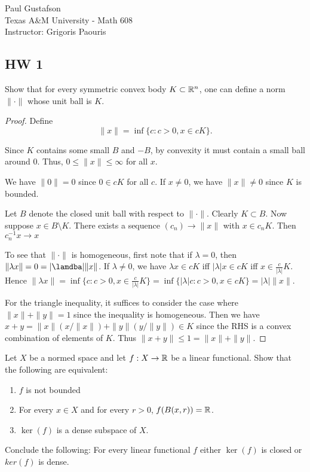 \documentclass{article}
\begin{document}
\noindent Paul Gustafson\\
\noindent Texas A\&M University - Math 608 \\ 
\noindent Instructor: Grigoris Paouris

\subsection*{HW 1}
 Show that for every symmetric convex body $K \subset \mathbb{R}^n$, one can define a norm $\| \cdot \|$ whose unit ball is $K$.
\begin{proof}
Define $$\|x\| = \inf \{ c: c > 0, x \in cK \}.$$

Since $K$ contains some small $B$ and $-B$, by convexity it must contain a small ball around $0$.  Thus, $0 \le \|x\| \le \infty$ for all $x$.

We have $\|0\| =  0$ since $0 \in cK$ for all $c$.  If $x \neq 0$, we have $\|x\| \neq 0$ since $K$ is bounded.

Let $B$ denote the closed unit ball with respect to $\| \cdot \|$. Clearly $K \subset B$. Now suppose $x \in B \setminus K$.  There exists a sequence $(c_n) \to \|x\|$ with $x \in c_nK$. Then $c_n^{-1} x \to x$

To see that $\| \cdot \|$ is homogeneous, first note that if $\lambda = 0$, then $\|\lambda x\| = 0 = |\lamdba| \|x\|$.  If $\lambda \neq 0$, we have $\lambda x \in cK$ iff $|\lambda|x \in cK$ iff $x \in \frac {c}{|\lambda|} K$. Hence $\|\lambda x\| = \inf \{ c: c > 0, x \in \frac{c}{|\lambda|}K \} = 
\inf \{ |\lambda| c: c > 0, x \in cK \} = |\lambda| \|x\|$.

For the triangle inequality, it suffices to consider the case where $\|x\| + \|y\| = 1$ since the inequality is homogeneous. Then we have
$x + y = \|x\| (x / \|x\|)  + \|y \| (y / \|y\|) \in K$ since the RHS is a convex combination of elements of $K$.  Thus $\|x + y\| \le 1 = \|x\| + \|y\|$.
\end{proof}

 Let $X$ be a normed space and let $f: X \to \mathbb{R}$ be a linear functional. Show that the following are equivalent:
\begin{enumerate}
\item $f$ is not bounded
\item For every $x \in X$ and for every $r > 0$, $f(B(x,r)) = \mathbb{R}$.
\item $\ker(f)$ is a dense subspace of $X$.
\end{enumerate}
Conclude the following: For every linear functional $f$ either $\ker(f)$ is closed or $ker(f)$ is dense.
\end{document}
